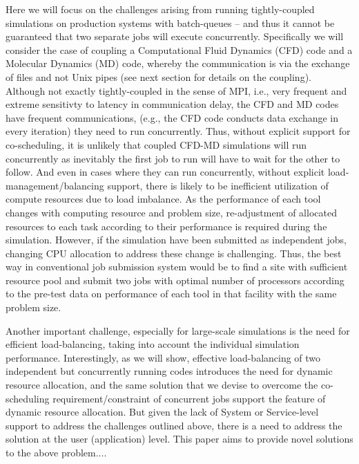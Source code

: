 \documentclass[conference,final]{IEEEtran}
\begin{document}
Here we will focus on the challenges arising from running tightly-coupled simulations on production systems with batch-queues -- and thus it cannot be guaranteed that two separate jobs will execute concurrently. Specifically we will consider the case of coupling a Computational Fluid Dynamics (CFD) code and a Molecular Dynamics (MD) code, whereby the communication is via the exchange of files and not Unix pipes (see next section for details on the coupling).  Although not exactly tightly-coupled in the sense of MPI, i.e., very frequent and extreme sensitivty to latency in communication delay, the CFD and MD codes have frequent communications, (e.g., the CFD code conducts data exchange in every iteration) they need to run concurrently.  Thus, without explicit support for co-scheduling, it is unlikely that coupled CFD-MD simulations will run concurrently as inevitably the first job to run will have to wait for the other to follow.
And even in cases where they can run concurrently, without explicit load-management/balancing support, there is likely to be inefficient utilization of compute resources due to load imbalance.  As the performance of each tool changes with computing resource and problem size, re-adjustment of allocated resources to each task according to their performance is required during the simulation. However, if the simulation have been submitted as independent jobs, changing CPU allocation to address these change is challenging. Thus, the best way in conventional job submission system would be to find a site with sufficient resource pool and submit two jobs with optimal number of processors according to the pre-test data on performance of each tool in that facility with the same problem size.

Another important challenge, especially for large-scale simulations is the need for efficient load-balancing, taking into account the individual simulation performance.  Interestingly, as we will show, effective load-balancing of two independent but concurrently running codes introduces the need for dynamic resource allocation, and the same solution that we devise to overcome the co-scheduling requirement/constraint of concurrent jobs support the feature of dynamic resource allocation.  But given the lack of System or Service-level support to address the challenges outlined above, there is a need to address the solution at the user (application) level. This paper aims to provide novel solutions to the above problem....
\end{document}
